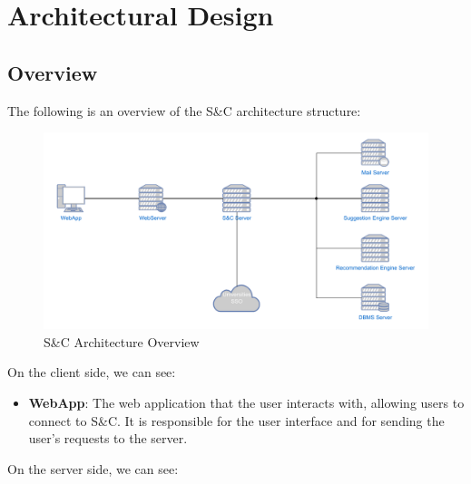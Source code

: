 \chapter{Architectural Design}
\label{ch:architectural-design}%

\section{Overview}
\label{sub:overview}

\par The following is an overview of the S\&C architecture structure:

\begin{figure}[H]
    \centering
    \includegraphics[width=1.0\textwidth]{Images/Overview_diagram.pdf}
    \caption{S\&C Architecture Overview}
    \label{fig:overview}
\end{figure}

\par On the client side, we can see:

\begin{itemize}
    \item \textbf{WebApp}: The web application that the user interacts with, allowing users to connect to S\&C.
                           It is responsible for the user interface and for sending the user's requests to the server.
\end{itemize}

\par On the server side, we can see:

